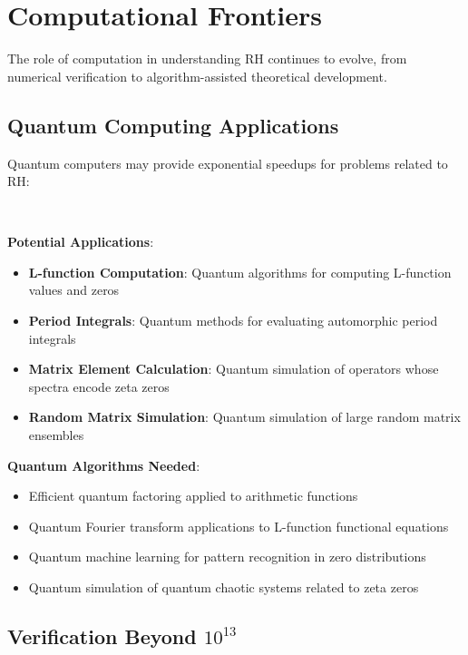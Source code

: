 \section{Computational Frontiers}
\label{sec:computational_frontiers}

The role of computation in understanding RH continues to evolve, from numerical verification to algorithm-assisted theoretical development.

\subsection{Quantum Computing Applications}
\label{subsec:quantum_computing}

Quantum computers may provide exponential speedups for problems related to RH:

\begin{research_direction}
~
\end{research_direction}

\noindent\textbf{Potential Applications}:
\begin{itemize}
\item \textbf{L-function Computation}: Quantum algorithms for computing L-function values and zeros
\item \textbf{Period Integrals}: Quantum methods for evaluating automorphic period integrals
\item \textbf{Matrix Element Calculation}: Quantum simulation of operators whose spectra encode zeta zeros
\item \textbf{Random Matrix Simulation}: Quantum simulation of large random matrix ensembles
\end{itemize}

\textbf{Quantum Algorithms Needed}:
\begin{itemize}
\item Efficient quantum factoring applied to arithmetic functions
\item Quantum Fourier transform applications to L-function functional equations
\item Quantum machine learning for pattern recognition in zero distributions
\item Quantum simulation of quantum chaotic systems related to zeta zeros
\end{itemize}

\subsection{Verification Beyond $10^{13}$}
\label{subsec:verification_beyond}

